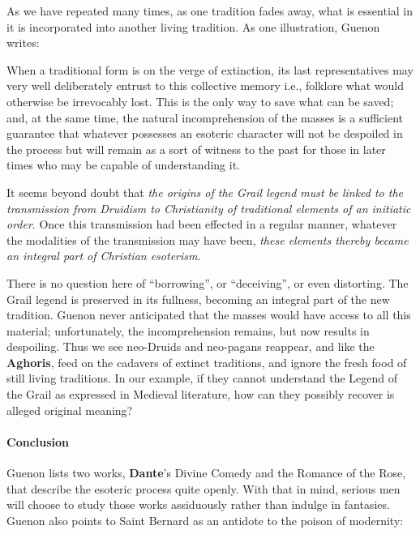 \begin{description}
As we have repeated many times, as one tradition fades away, what is essential in it is incorporated into another living tradition. As one illustration, Guenon writes:

\begin{quotationx}
When a traditional form is on the verge of extinction, its last representatives may very well deliberately entrust to this collective memory i.e., folklore what would otherwise be irrevocably lost. This is the only way to save what can be saved; and, at the same time, the natural incomprehension of the masses is a sufficient guarantee that whatever possesses an esoteric character will not be despoiled in the process but will remain as a sort of witness to the past for those in later times who may be capable of understanding it.

It seems beyond doubt that \emph{the origins of the Grail legend must be linked to the transmission from Druidism to Christianity of traditional elements of an initiatic order}. Once this transmission had been effected in a regular manner, whatever the modalities of the transmission may have been, \emph{these elements thereby became an integral part of Christian esoterism}.
\end{quotationx}


There is no question here of ``borrowing'', or ``deceiving'', or even distorting. The Grail legend is preserved in its fullness, becoming an integral part of the new tradition. Guenon never anticipated that the masses would have access to all this material; unfortunately, the incomprehension remains, but now results in despoiling. Thus we see neo-Druids and neo-pagans reappear, and like the \textbf{Aghoris}, feed on the cadavers of extinct traditions, and ignore the fresh food of still living traditions. In our example, if they cannot understand the Legend of the Grail as expressed in Medieval literature, how can they possibly recover is alleged original meaning?
\end{description}


\paragraph{Conclusion}


Guenon lists two works, \textbf{Dante}'s Divine Comedy and the Romance of the Rose, that describe the esoteric process quite openly. With that in mind, serious men will choose to study those works assiduously rather than indulge in fantasies. Guenon also points to Saint Bernard as an antidote to the poison of modernity:

